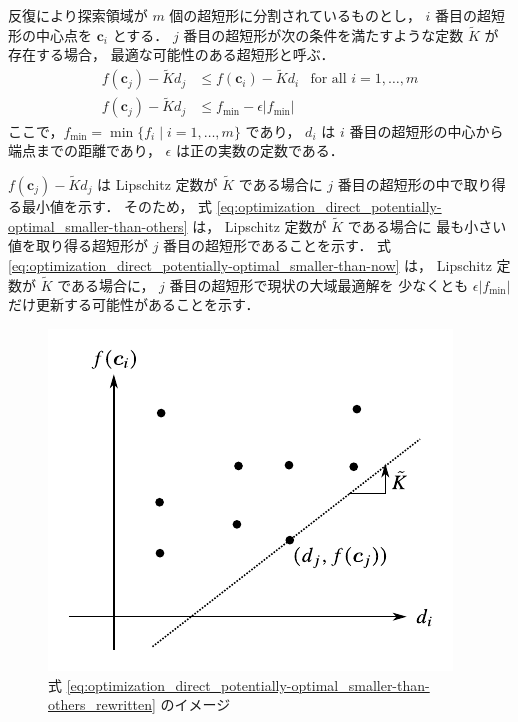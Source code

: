 \begin{definition}
    \label{def:optimization_direct_potentially-optimal}
    反復により探索領域が $m$ 個の超短形に分割されているものとし，
    $i$ 番目の超短形の中心点を $\bm{c}_i$ とする．
    $j$ 番目の超短形が次の条件を満たすような定数 $\tilde{K}$ が存在する場合，
    最適な可能性のある超短形と呼ぶ．
    \begin{align}
        f(\bm{c}_j) - \tilde{K} d_j & \le f(\bm{c}_i) - \tilde{K} d_i                & \text{for all $i = 1, \ldots, m$}
        \label{eq:optimization_direct_potentially-optimal_smaller-than-others}
        \\
        f(\bm{c}_j) - \tilde{K} d_j & \le f_{\text{min}} - \epsilon |f_{\text{min}}|
        \label{eq:optimization_direct_potentially-optimal_smaller-than-now}
    \end{align}
    ここで，$f_{\text{min}} = \min{\{f_i \mid i = 1, \ldots, m\}}$ であり，
    $d_i$ は $i$ 番目の超短形の中心から端点までの距離であり，
    $\epsilon$ は正の実数の定数である．
\end{definition}

$f(\bm{c}_j) - \tilde{K} d_j$ は
Lipschitz 定数が $\tilde{K}$ である場合に $j$ 番目の超短形の中で取り得る最小値を示す．
そのため，
式 \eqref{eq:optimization_direct_potentially-optimal_smaller-than-others} は，
Lipschitz 定数が $\tilde{K}$ である場合に
最も小さい値を取り得る超短形が $j$ 番目の超短形であることを示す．
式 \eqref{eq:optimization_direct_potentially-optimal_smaller-than-now} は，
Lipschitz 定数が $\tilde{K}$ である場合に，
$j$ 番目の超短形で現状の大域最適解を
少なくとも $\epsilon |f_{\text{min}}|$ だけ更新する可能性があることを示す．

\begin{figure}[tp]
    \centering
    \includegraphics[width=0.7\linewidth]{optimization/DIRECT-potentially-optimal.pdf}
    \caption{式 \eqref{eq:optimization_direct_potentially-optimal_smaller-than-others_rewritten} のイメージ}
    \label{fig:optimization_direct_potentially-optimal_smaller-than-others-image}
\end{figure}

